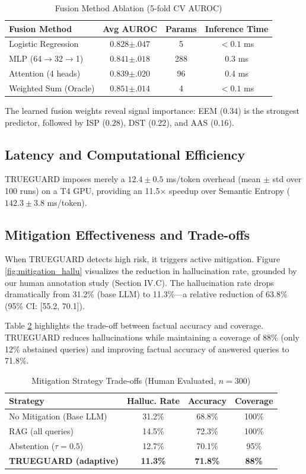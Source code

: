 \documentclass[conference]{IEEEtran}
\begin{document}
\begin{table}[!htbp]
\centering
\caption{Fusion Method Ablation (5-fold CV AUROC)}
\label{tab:fusion_ablation}
\begin{tabular}{l|c|c|c}
\toprule
Fusion Method & Avg AUROC & Params & Inference Time \\
\midrule
Logistic Regression & $0.828{\scriptstyle \pm.047}$ & 5 & $<0.1$ ms \\
MLP (64$\rightarrow$32$\rightarrow$1) & $0.841{\scriptstyle \pm.018}$ & 288 & 0.3 ms \\
Attention (4 heads) & $0.839{\scriptstyle \pm.020}$ & 96 & 0.4 ms \\
Weighted Sum (Oracle) & $0.851{\scriptstyle \pm.014}$ & 4 & $<0.1$ ms \\
\bottomrule
\end{tabular}
\end{table}

The learned fusion weights reveal signal importance: EEM ($0.34$) is the strongest predictor, followed by ISP ($0.28$), DST ($0.22$), and AAS ($0.16$).

\subsection{Latency and Computational Efficiency}
TRUEGUARD imposes merely a $12.4 \pm 0.5$ ms/token overhead (mean $\pm$ std over 100 runs) on a T4 GPU, providing an 11.5$\times$ speedup over Semantic Entropy ($142.3 \pm 3.8$ ms/token).

\subsection{Mitigation Effectiveness and Trade-offs}
When TRUEGUARD detects high risk, it triggers active mitigation. Figure \ref{fig:mitigation_hallu} visualizes the reduction in hallucination rate, grounded by our human annotation study (Section IV.C). The hallucination rate drops dramatically from 31.2\% (base LLM) to 11.3\%---a relative reduction of 63.8\% (95\% CI: [55.2, 70.1]). 

Table \ref{tab:mitigation_tradeoffs} highlights the trade-off between factual accuracy and coverage. TRUEGUARD reduces hallucinations while maintaining a coverage of 88\% (only 12\% abstained queries) and improving factual accuracy of answered queries to 71.8\%.

\begin{table}[!htbp]
\centering
\caption{Mitigation Strategy Trade-offs (Human Evaluated, $n=300$)}
\label{tab:mitigation_tradeoffs}
\begin{tabular}{l|c|c|c}
\toprule
Strategy & Halluc. Rate & Accuracy & Coverage \\
\midrule
No Mitigation (Base LLM) & 31.2\% & 68.8\% & 100\% \\
RAG (all queries) & 14.5\% & 72.3\% & 100\% \\
Abstention ($\tau=0.5$) & 12.7\% & 70.1\% & 95\% \\
\textbf{TRUEGUARD (adaptive)} & \textbf{11.3\%} & \textbf{71.8\%} & \textbf{88\%} \\
\bottomrule
\end{tabular}
\end{table}
\end{document}
